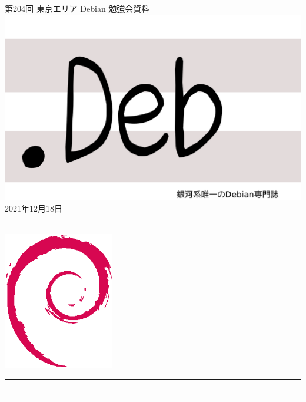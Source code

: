 \documentclass[mingoth,a4paper]{jsarticle}
\newcommand{\debmtgyear}{2021}
\newcommand{\debmtgmonth}{12}
\newcommand{\debmtgdate}{18}
\newcommand{\debmtgnumber}{204}
\begin{document}
\begin{titlepage}
\thispagestyle{empty}

\vspace*{-2cm}
第\debmtgnumber{}回 東京エリア Debian 勉強会資料\\
\hspace*{-2cm}
\includegraphics{image-assets/dotdeb.pdf}\\
\hfill{}\debmtgyear{}年\debmtgmonth{}月\debmtgdate{}日

\\

\vspace*{-2cm}
\hfill{}\includegraphics[height=6cm]{image-assets/openlogo-nd.eps}
\end{titlepage}

\newpage

\begin{minipage}[b]{0.2\hsize}
 \colorbox{titleback}{}
\end{minipage}
\begin{minipage}[b]{0.8\hsize}
\hrule
\vspace{2mm}
\hrule
\begin{multicols}{2}
\tableofcontents
\end{multicols}
\vspace{2mm}
\hrule
\end{minipage}
\end{document}
